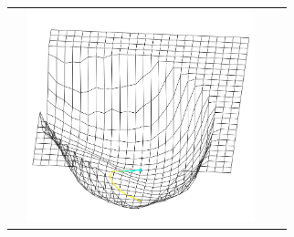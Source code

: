 \documentclass{acmsiggraph}
\begin{document}
\begin{longtable}{ |p{1.5cm}|p{1.5cm}||p{6.5cm}|p{6.5cm}|  }
 & \parbox[c]{1em}{\includegraphics[width=2.6in, trim=0 0 0 -5]{Images/VGG-PCA-3d-mesh.png}}
 \\
 \hline
\end{longtable}
\end{document}
